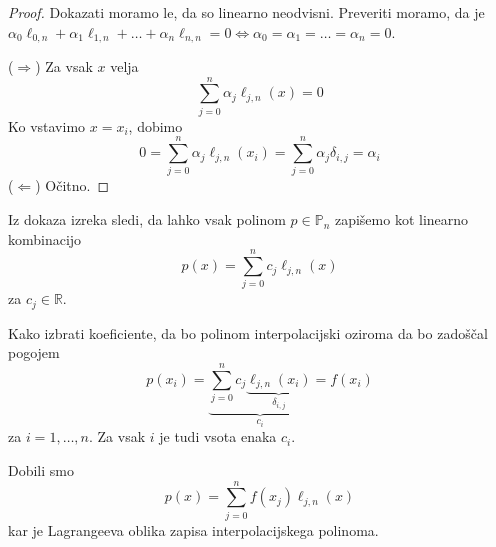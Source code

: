 \documentclass[a4paper,12pt]{article}
\theoremstyle{definition}
\theoremstyle{remark}
\newcommand{\R}{\mathbb{R}}
\newcommand{\Pp}{\mathbb{P}}
\begin{document}
\begin{proof}
    Dokazati moramo le, da so linearno neodvisni. Preveriti moramo, da je $\alpha_0 \ell_{0, n} +  \alpha_1 \ell_{1, n} + \dots +
    \alpha_n \ell_{n, n} = 0 \iff \alpha_0 = \alpha_1 = \dots = \alpha_n = 0$.

    ($\Longrightarrow$)
    Za vsak $x$ velja
    \begin{equation*}
        \sum_{j = 0}^{n} \alpha_j \ell_{j, n} (x) = 0
    \end{equation*}
    Ko vstavimo $x = x_i$, dobimo
    \begin{equation*}
        0 = \sum_{j = 0}^{n} \alpha_j \ell_{j, n} (x_i) = \sum_{j = 0}^{n} \alpha_j \delta_{i, j} = \alpha_i
    \end{equation*}
    ($\Longleftarrow$) Očitno.
\end{proof}

Iz dokaza izreka sledi, da lahko vsak polinom $p \in \Pp_n$ zapišemo kot linearno kombinacijo
\begin{equation*}
    p(x) = \sum_{j = 0}^{n} c_j \ell_{j, n} (x)
\end{equation*}
za $c_j \in \R$.

Kako izbrati koeficiente, da bo polinom interpolacijski oziroma da bo zadoščal pogojem
\begin{equation*}
    p(x_i) = \underbrace{\sum_{j = 0}^{n} c_j \underbrace{\ell_{j, n} (x_i)}_{\delta_{i, j}}}_{c_i} = f(x_i)
\end{equation*}
za $i = 1, \dots, n$. Za vsak $i$ je tudi vsota enaka $c_i$.

Dobili smo
\begin{equation*}
    p(x) = \sum_{j = 0}^{n} f(x_j) \ell_{j, n}(x)
\end{equation*}
kar je Lagrangeeva oblika zapisa interpolacijskega polinoma.
\end{document}
